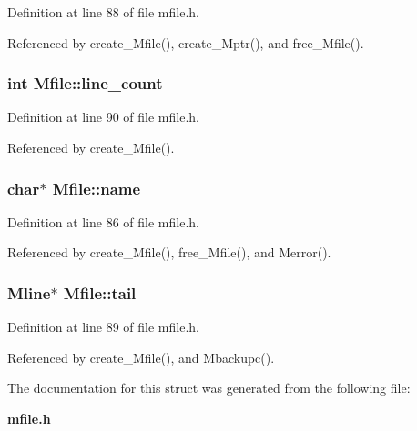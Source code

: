 Definition at line 88 of file mfile.h.

Referenced by create\_\-Mfile(), create\_\-Mptr(), and free\_\-Mfile().
\subsubsection{\setlength{\rightskip}{0pt plus 5cm}int \bf{Mfile::line\_\-count}}\label{structMfile_d3f0bae189dcdfe03a1f0bccf6ad929d}




Definition at line 90 of file mfile.h.

Referenced by create\_\-Mfile().
\subsubsection{\setlength{\rightskip}{0pt plus 5cm}char$\ast$ \bf{Mfile::name}}\label{structMfile_aff6be44526ccdc2c2e0d8d605874e80}




Definition at line 86 of file mfile.h.

Referenced by create\_\-Mfile(), free\_\-Mfile(), and Merror().
\subsubsection{\setlength{\rightskip}{0pt plus 5cm}\bf{Mline}$\ast$ \bf{Mfile::tail}}\label{structMfile_eba99f4384fefa17755cc5ca36385804}




Definition at line 89 of file mfile.h.

Referenced by create\_\-Mfile(), and Mbackupc().

The documentation for this struct was generated from the following file:\begin{CompactItemize}
\item 
\bf{mfile.h}\end{CompactItemize}
